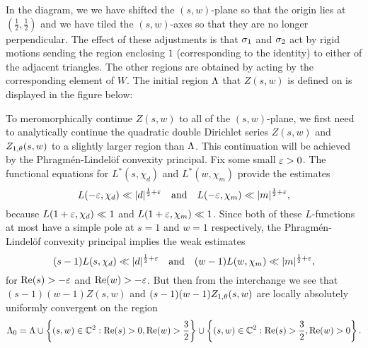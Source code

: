 \documentclass[12pt,reqno,oneside]{amsart}
\begin{document}
    In the diagram, we we have shifted the $(s,w)$-plane so that the origin lies at $\left(\frac{1}{2},\frac{1}{2}\right)$ and we have tiled the $(s,w)$-axes so that they are no longer perpendicular. The effect of these adjustments is that $\sigma_{1}$ and $\sigma_{2}$ act by rigid motions sending the region enclosing $1$ (corresponding to the identity) to either of the adjacent triangles. The other regions are obtained by acting by the corresponding element of $W$. The initial region $\Lambda$ that $Z(s,w)$ is defined on is displayed in the figure below:
    
    \begin{center}
    \end{center}
    
     To meromorphically continue $Z(s,w)$ to all of the $(s,w)$-plane, we first need to analytically continue the quadratic double Dirichlet series $Z(s,w)$ and $Z_{1,\theta}(s,w)$ to a slightly larger region than $\Lambda$. This continuation will be achieved by the Phragm\'en-Lindel\"of convexity principal. Fix some small $\varepsilon > 0$. The functional equations for $L^{\ast}(s,\chi_{d})$ and $L^{\ast}(w,\chi_{m})$ provide the estimates
    \[
        L(-\varepsilon,\chi_{d}) \ll |d|^{\frac{1}{2}+\varepsilon} \quad \text{and} \quad L(-\varepsilon,\chi_{m}) \ll |m|^{\frac{1}{2}+\varepsilon},
    \]
    because $L(1+\varepsilon,\chi_{d}) \ll 1$ and $L(1+\varepsilon,\chi_{m}) \ll 1$. Since both of these $L$-functions at most have a simple pole at $s = 1$ and $w = 1$ respectively, the Phragm\'en-Lindel\"of convexity principal implies the weak estimates
    \[
        (s-1)L(s,\chi_{d}) \ll |d|^{\frac{1}{2}+\varepsilon} \quad \text{and} \quad (w-1)L(w,\chi_{m}) \ll |m|^{\frac{1}{2}+\varepsilon},
    \]
    for $\mathrm{Re}(s) > -\varepsilon$ and $\mathrm{Re}(w) > -\varepsilon$. But then from the interchange we see that $(s-1)(w-1)Z(s,w)$ and $(s-1)(w-1)Z_{1,\theta}(s,w)$ are locally absolutely uniformly convergent on the region
    \[
        \Lambda_{0} = \Lambda \cup \left\{(s,w) \in \mathbb{C}^{2}:\mathrm{Re}(s) > 0, \mathrm{Re}(w) > \frac{3}{2}\right\} \cup \left\{(s,w) \in \mathbb{C}^{2}:\mathrm{Re}(s) > \frac{3}{2}, \mathrm{Re}(w) > 0\right\}.
    \]
    
\end{document}
